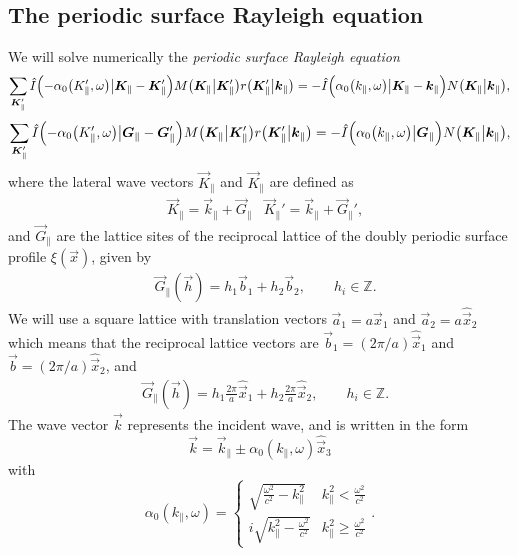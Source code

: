 \subsection*{The periodic surface Rayleigh equation}
We will solve numerically the \emph{periodic surface Rayleigh equation}
\begin{equation}
    \sum_{\vec K_{\|}'} \hat I\del[2]{-\alpha_0 \del[1]{K_{\|}', \omega} \big\vert \vec K_{\|} - \vec K_{\|}'} M\del[1]{\vec K_{\|} \big\vert \vec K_{\|}'} r\del[1]{\vec K_{\|}' \big\vert \vec k_{\|}} 
    = -\hat I \del[2]{\alpha_0 \del[1]{k_{\|}, \omega} \big\vert \vec K_{\|} - \vec k_{\|}} N\del[1]{\vec K_{\|} \big\vert \vec k_{\|}},
    \label{eq:rayleigh}
\end{equation}
\begin{equation}
    \sum_{\vec K_{\|}'} \hat I\del[2]{-\alpha_0 \del[1]{K_{\|}', \omega} \big\vert \vec G_{\|} - \vec G_{\|}'} M\del[1]{\vec K_{\|} \big\vert \vec K_{\|}'} r\del[1]{\vec K_{\|}' \big\vert \vec k_{\|}} 
    = -\hat I \del[2]{\alpha_0 \del[1]{k_{\|}, \omega} \big\vert \vec G_{\|}} N\del[1]{\vec K_{\|} \big\vert \vec k_{\|}},
\end{equation}
where the lateral wave vectors $\vec K_{\|}$ and $\vec K_{\|}$ are defined as
\begin{align}
    &\vec K_{\|} = \vec k_{\|} + \vec G_{\|} &\vec K_{\|}' = \vec k_{\|} + \vec G_{\|}',
\end{align}
and $\vec G_{\|}$ are the lattice sites of the reciprocal lattice of the doubly periodic surface profile $\xi(\vec x)$, given by
\begin{align}
    &\vec G_{\|} (\vec h) = h_1 \vec b_1 + h_2 \vec b_2, \qquad h_i \in \mathbb{Z}.
\end{align}
We will use a square lattice with translation vectors $\vec a_1 = a \hat {\vec x}_1$ and $\vec a_2 = a\hat{\vec x}_2$ which means that the reciprocal lattice vectors are $\vec b_1 = (2\pi/a)\hat{\vec x}_1$ and $\vec b=(2\pi/a)\hat{\vec x}_2$, and
\begin{align}
    &\vec G_{\|} (\vec h) = h_1 \frac{2\pi}{a} \hat{\vec x}_1 + h_2 \frac{2\pi}{a} \hat{\vec x}_2, \qquad h_i \in \mathbb{Z}.
\end{align}
The wave vector $\vec k$ represents the incident wave, and is written in the form
\begin{equation}
    \vec k = \vec k_\| \pm \alpha_0(k_\|, \omega)\hat {\vec x}_3
\end{equation}
with
\begin{equation}
    \alpha_0(k_\|, \omega) =
    \begin{cases}
        \sqrt{\frac{\omega^2}{c^2} - k_\|^2} &k_\|^2 < \frac{\omega^2}{c^2} \\
        i\sqrt{k_\|^2 - \frac{\omega^2}{c^2}} &k_\|^2 \geq \frac{\omega^2}{c^2}
    \end{cases}.
\end{equation}

